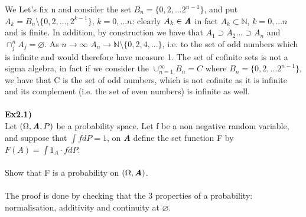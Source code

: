 \documentclass[12pt,mythesisstyle]{report}
\begin{document}
We Let's fix n and consider the set \(B_n=\{0,2,...2^{n-1}\}\), and put \(A_k=B_n\setminus\{0,2,...,2^{k-1}\}\), \(k=0,...n\): clearly \(A_k\in\textbf{\textit{A}}\) in fact \(A_k\subset\mathbb{N}\), \(k=0,...n\) and is finite. In addition, by construction we have that \(A_1\supset A_2...\supset A_n\) and $\cap_{j}^n A_j=\varnothing$. As \(n\rightarrow\infty\) $A_n\rightarrow\mathbb{N}\setminus\{0,2,4,...\}$, i.e. to the set of odd numbers which is infinite and would therefore have measure 1. The set of cofinite sets is not a sigma algebra, in fact if we consider the \(\cup_{n=1}^\infty B_n=C\) where $B_n=\{0,2,...2^{n-1}\}$, we have that C is the set of odd numbers, which is not cofinite as it is infinite and its complement (i.e. the set of even numbers) is infinite as well.
\\\\
\textbf{Ex2.1)}\\
Let $(\Omega, \textbf{\textit{A}}, P)$ be a probability space. Let f be a non negative random variable, and suppose that $\int fdP=1$, on \textbf{\textit{A}} define the set function F by $F(A)=\int1_A\cdot fdP$.
\\\\
Show that F is a probability on $(\Omega, \textbf{\textit{A}})$.
\\
\\The proof is done by checking that the 3 properties of a probability: normalisation, additivity and continuity at $\varnothing$.
\\
\end{document}
